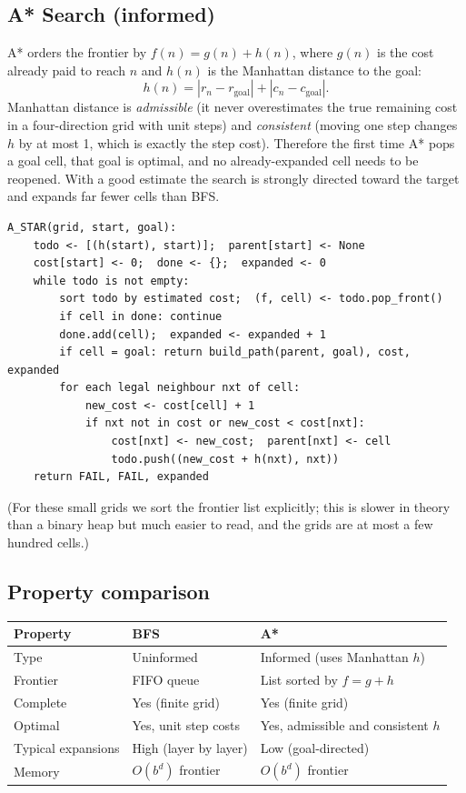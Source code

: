 \documentclass[11pt,a4paper]{article}
\begin{document}
\subsection{A* Search (informed)}

A* orders the frontier by $f(n)=g(n)+h(n)$, where $g(n)$ is the cost already paid to reach $n$
and $h(n)$ is the Manhattan distance to the goal:
\[
h(n)=|r_n-r_{\text{goal}}|+|c_n-c_{\text{goal}}|.
\]
Manhattan distance is \emph{admissible} (it never overestimates the true remaining cost in a
four-direction grid with unit steps) and \emph{consistent} (moving one step changes $h$ by at
most 1, which is exactly the step cost). Therefore the first time A* pops a goal cell, that
goal is optimal, and no already-expanded cell needs to be reopened. With a good estimate the
search is strongly directed toward the target and expands far fewer cells than BFS.

\begin{verbatim}
A_STAR(grid, start, goal):
    todo <- [(h(start), start)];  parent[start] <- None
    cost[start] <- 0;  done <- {};  expanded <- 0
    while todo is not empty:
        sort todo by estimated cost;  (f, cell) <- todo.pop_front()
        if cell in done: continue
        done.add(cell);  expanded <- expanded + 1
        if cell = goal: return build_path(parent, goal), cost, expanded
        for each legal neighbour nxt of cell:
            new_cost <- cost[cell] + 1
            if nxt not in cost or new_cost < cost[nxt]:
                cost[nxt] <- new_cost;  parent[nxt] <- cell
                todo.push((new_cost + h(nxt), nxt))
    return FAIL, FAIL, expanded
\end{verbatim}

(For these small grids we sort the frontier list explicitly; this is slower in theory than a
binary heap but much easier to read, and the grids are at most a few hundred cells.)

\subsection{Property comparison}

\begin{center}
\begin{tabular}{@{}p{3.0cm}p{5.8cm}p{5.8cm}@{}}
\toprule
Property & BFS & A* \\
\midrule
Type & Uninformed & Informed (uses Manhattan $h$) \\
Frontier & FIFO queue & List sorted by $f=g+h$ \\
Complete & Yes (finite grid) & Yes (finite grid) \\
Optimal & Yes, unit step costs & Yes, admissible and consistent $h$ \\
Typical expansions & High (layer by layer) & Low (goal-directed) \\
Memory & $O(b^d)$ frontier & $O(b^d)$ frontier \\
\bottomrule
\end{tabular}
\end{center}
\end{document}
